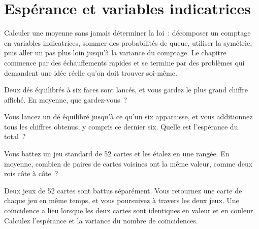 \chapter{Espérance et variables indicatrices}\label{ch:iv1:expectation-and-indicators}

\begin{ivtrains}
Calculer une moyenne sans jamais déterminer la loi~: décomposer un comptage en variables indicatrices, sommer
des probabilités de queue, utiliser la symétrie, puis aller un pas plus loin jusqu'à la variance du comptage. Le chapitre
commence par des échauffements rapides et se termine par des problèmes qui demandent une idée réelle qu'on doit trouver soi-même.
\end{ivtrains}

\begin{question}\label{iq:iv1:expectation-and-indicators:1}
Deux dés équilibrés à six faces sont lancés, et vous gardez le plus grand chiffre affiché. En moyenne, que gardez-vous~?
\end{question}

\begin{question}\label{iq:iv1:expectation-and-indicators:2}
Vous lancez un dé équilibré jusqu'à ce qu'un six apparaisse, et vous additionnez tous les chiffres obtenus, y compris ce dernier six. Quelle
est l'espérance du total~?
\end{question}

\begin{question}\label{iq:iv1:expectation-and-indicators:3}
Vous battez un jeu standard de 52 cartes et les étalez en une rangée. En moyenne, combien de paires de cartes voisines
ont la même valeur, comme deux rois côte à côte~?
\end{question}

\begin{question}\label{iq:iv1:expectation-and-indicators:4}
Deux jeux de 52 cartes sont battus séparément. Vous retournez une carte de chaque jeu en même temps, et vous poursuivez
à travers les deux jeux. Une coïncidence a lieu lorsque les deux cartes sont identiques en valeur et en couleur. Calculez l'espérance et la variance du nombre de coïncidences.
\end{question}

